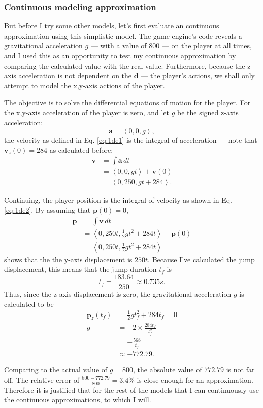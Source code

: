 \documentclass[a4paper,12pt]{article}
\newcommand{\tvec}[1]{\boldsymbol{#1}}
\newcommand{\tang}[1]{\left\langle #1 \right\rangle}
\newcommand{\td}{\tvec{d}}
\newcommand{\ta}{\tvec{a}}
\newcommand{\tv}{\tvec{v}}
\newcommand{\tp}{\tvec{p}}
\begin{document}
\subsubsection{Continuous modeling approximation}
But before I try some other models, let's first evaluate an continuous approximation using this simplistic model.
The game engine's code reveals a gravitational acceleration $g$ --- with a value of $800$ --- on the player at all times, and I used this as an opportunity to test my continuous approximation by comparing the calculated value with the real value. Furthermore, because the z-axis acceleration is not dependent on the $\td$ --- the player's actions, we shall only attempt to model the x,y-axis actions of the player.

The objective is to solve the differential equations of motion for the player. For the x,y-axis acceleration of the player is zero, and let $g$ be the signed z-axis acceleration:
\[
    \ta = \tang{0, 0, g},
\]
the velocity as defined in Eq. \ref{eq:1de1} is the integral of acceleration --- note that $\tv_{z}(0) = 284$ as calculated before:
\begin{align*}
    \tv &= \int \ta \, dt\\
    &= \tang{0, 0, gt} + \tv(0)\\
    &= \tang{0, 250, gt + 284}.
\end{align*}

Continuing, the player position is the integral of velocity as shown in Eq. \ref{eq:1de2}. By assuming that $\tp(0) = 0$,
\begin{align*}
    \tp &= \int \tv \, dt\\
    &= \tang{0, 250t, \frac{1}{2}gt^2 + 284t} + \tp(0)\\
    &= \tang{0, 250t, \frac{1}{2}gt^2 + 284t}
\end{align*}
shows that the the y-axis displacement is $250t$. Because I've calculated the jump displacement, this means that the jump duration $t_f$ is
\[
    t_f = \frac{183.64}{250} \approx 0.735 \si{s}.
\]
Thus, since the z-axis displacement is zero, the gravitational acceleration $g$ is calculated to be
\begin{align*}
    \tp_{z}(t_f) &= \frac{1}{2}gt_f^2 + 284t_f = 0\\
    g &= - 2 \times \frac{284t_f}{t_f^2}\\
    &= -\frac{568}{t_f}\\
    &\approx -772.79.
\end{align*}

Comparing to the actual value of $g=800$, the absolute value of $772.79$ is not far off. The relative error of $\frac{800 - 772.79}{800} = 3.4\%$ is close enough for an approximation. Therefore it is justified that for the rest of the models that I can continuously use the continuous approximations, to which I will.
\end{document}
